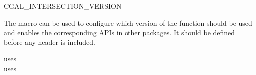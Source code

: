 \begin{ccRefMacro}{CGAL_INTERSECTION_VERSION}

\ccDefinition

The macro  can be used to configure
which version of the  function should be used and
enables the corresponding APIs in other {\cgal} packages. It should be
defined before any {\cgal} header is included.

  uses  \\
  uses 

\ccSeeAlso
{} \\

\end{ccRefMacro}
